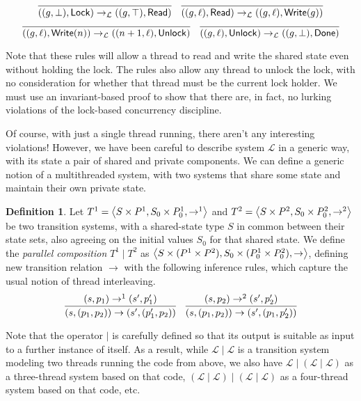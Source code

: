\documentclass{amsbook}
\theoremstyle{definition}
\newtheorem{definition}[theorem]{Definition}
\theoremstyle{remark}
\numberwithin{section}{chapter}
\numberwithin{equation}{chapter}
\begin{document}
$$\infer{((g, \bot), \mathsf{Lock}) \to_{\mathcal L} ((g, \top), \mathsf{Read})}{}
\quad \infer{((g, \ell), \mathsf{Read}) \to_{\mathcal L} ((g, \ell), \mathsf{Write}(g))}{}$$
$$\infer{((g, \ell), \mathsf{Write}(n)) \to_{\mathcal L} ((n+1, \ell), \mathsf{Unlock})}{}
\quad \infer{((g, \ell), \mathsf{Unlock}) \to_{\mathcal L} ((g, \bot), \mathsf{Done})}{}$$

\smallskip

Note that these rules will allow a thread to read and write the shared state even without holding the lock.
The rules also allow any thread to unlock the lock, with no consideration for whether that thread must be the current lock holder.
We must use an invariant-based proof to show that there are, in fact, no lurking violations of the lock-based concurrency discipline.

Of course, with just a single thread running, there aren't any interesting violations!
However, we have been careful to describe system $\mathcal L$ in a generic way, with its state a pair of shared and private components.
We can define a generic notion of a multithreaded system, with two systems that share some state and maintain their own private state.

\encoding
\begin{definition}
  Let $T^1 = {\left \langle S \times P^1, S_0 \times P^1_0, \to^1 \right \rangle}$ and $T^2 = {\left \langle S \times P^2, S_0 \times P^2_0, \to^2 \right \rangle}$ be two transition systems, with a shared-state type $S$ in common between their state sets, also agreeing on the initial values $S_0$ for that shared state.  We define the \emph{parallel composition} $T^1 \mid T^2$ as ${\left \langle S \times (P^1 \times P^2), S_0 \times (P^1_0 \times P^2_0), \to \right \rangle}$, defining new transition relation $\to$ with the following inference rules, which capture the usual notion of thread interleaving.
  $$\infer{(s, (p_1, p_2)) \to (s', (p'_1, p_2))}{
    (s, p_1) \to^1 (s', p'_1)
  }
  \quad \infer{(s, (p_1, p_2)) \to (s', (p_1, p'_2))}{
    (s, p_2) \to^2 (s', p'_2)
  }$$
\end{definition}

Note that the operator $\mid$ is carefully defined so that its output is suitable as input to a further instance of itself.
As a result, while $\mathcal L \mid \mathcal L$ is a transition system modeling two threads running the code from above, we also have $\mathcal L \mid (\mathcal L \mid \mathcal L)$ as a three-thread system based on that code, $(\mathcal L \mid \mathcal L) \mid (\mathcal L \mid \mathcal L)$ as a four-thread system based on that code, etc.
\end{document}
